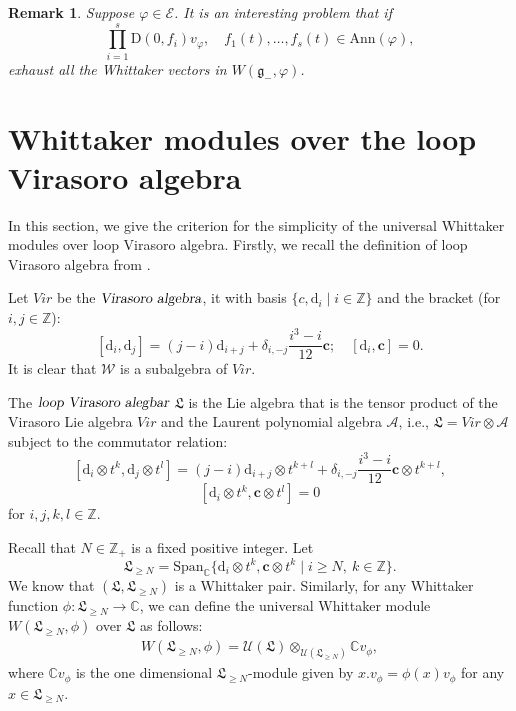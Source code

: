 \documentclass[12pt, a4paper]{amsart}
\newcommand{\fg}{\mathfrak g}
\newcommand{\C}{\mathbb{C}}
\newcommand{\Z}{\mathbb Z}
\newcommand{\rd}{\mathrm{d}}
\newcommand{\rD}{\mathrm{D}}
\newcommand{\U}{\mathcal{U}}
\theoremstyle{Theorem}
\theoremstyle{Theorem}
\newtheorem{remark}[thm]{Remark}
\numberwithin{equation}{section}
\begin{document}
\begin{remark}Suppose $\varphi\in\mathcal{E}$.
It is an interesting problem that if
\[\prod_{i=1}^{s}\rD(0,f_{i})v_{\varphi},\quad f_{1}(t),\dots, f_{s}(t)\in\mathrm{Ann}(\varphi),\]
exhaust all the Whittaker vectors in $W(\fg_{-},\varphi)$.
\end{remark}



\section{Whittaker modules over the loop Virasoro algebra}
In this section, we give the criterion for the simplicity of the universal Whittaker modules over loop Virasoro algebra.
Firstly, we recall the definition of loop Virasoro algebra from \cite{GLZ}.

Let $Vir$ be the $\textsl{Virasoro algebra}$,
it with basis $\{c,\rd_{i}\mid i\in\Z\}$ and the bracket (for $i, j\in\Z$):
\[[\rd_{i},\rd_{j}]=(j-i)\rd_{i+j}+\delta_{i,-j}\frac{i^{3}-i}{12}\bm{c};\quad [\rd_{i},\bm{c}]=0.\]
It is clear that $\mathcal{W}$ is a subalgebra of $Vir$.

The $\textsl{loop Virasoro alegbar}$ $\mathfrak{L}$ is the Lie algebra that is the tensor product of
the Virasoro Lie algebra $Vir$ and the Laurent polynomial algebra $\mathcal{A}$,
i.e., $\mathfrak{L}=Vir\otimes\mathcal{A}$ subject to the commutator relation:
\[[\rd_{i}\otimes t^{k},\rd_{j}\otimes t^{l}]=(j-i)\rd_{i+j}\otimes t^{k+l}
+\delta_{i,-j}\frac{i^{3}-i}{12}\bm{c}\otimes t^{k+l},\]
\[[\rd_{i}\otimes t^{k},\bm{c}\otimes t^{l}]=0\]
for $i,j,k,l\in\Z$.

Recall that $N\in\Z_{+}$ is a fixed positive integer.
Let \[\mathfrak{L}_{\geq N}=\text{Span}_{\C}\{\rd_{i}\otimes t^{k}, \bm{c}\otimes t^{k}\mid i\geq N,\ k\in\Z\}.\]
We know that $(\mathfrak{L},\mathfrak{L}_{\geq N})$ is a Whittaker pair.
Similarly, for any Whittaker function $\phi:\mathfrak{L}_{\geq N}\rightarrow\C$, we can define the
universal Whittaker module $W(\mathfrak{L}_{\geq N},\phi)$ over $\mathfrak{L}$ as follows:
\begin{align}\label{Vir-Whit}
W(\mathfrak{L}_{\geq N},\phi)=\U(\mathfrak{L})\otimes_{\U(\mathfrak{L}_{\geq N})}\C v_{\phi},
\end{align}
where $\C v_{\phi}$ is the one dimensional $\mathfrak{L}_{\geq N}$-module given by
$x.v_{\phi}=\phi(x)v_{\phi}$ for any $x\in\mathfrak{L}_{\geq N}$.
\end{document}
